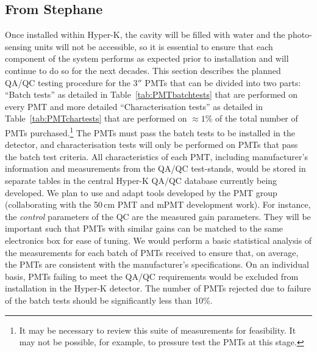 \documentclass[12pt,a4paper]{article}
\newcommand{\inches}{$''$\xspace}
\begin{document}
\subsection{From Stephane}
Once installed within Hyper-K, the cavity will be filled with water and the photo-sensing units will not be accessible, so it is essential to ensure that each component of the system performs as expected prior to installation and will continue to do so for the next decades. This section describes the planned QA/QC testing procedure for the 3\inches PMTs that can be divided into two parts: ``Batch tests'' as detailed in Table~\ref{tab:PMTbatchtests} that are performed on every PMT and more detailed ``Characterisation tests'' as detailed in Table~\ref{tab:PMTchartests} that are performed on $\approx 1$\% of the total number of PMTs purchased.\footnote{It may be necessary to review this suite of measurements for feasibility. It may not be possible, for example, to pressure test the PMTs at this stage.}
The PMTs must pass the batch tests to be installed in the detector, and characterisation tests will only be performed on PMTs that pass the batch test criteria. All characteristics of each PMT, including manufacturer's information and measurements from the QA/QC test-stands, would be stored in separate tables in the central Hyper-K QA/QC database currently being developed. We plan to use and adapt tools developed by the PMT group (collaborating with the 50\,cm PMT and mPMT development work). For instance, the {\it{control}} parameters of the QC are the measured gain parameters. They will be important such that PMTs with similar gains can be matched to the same electronics box for ease of tuning. We would perform a basic statistical analysis of the measurements for each batch of PMTs received to ensure that, on average, the PMTs are consistent with the manufacturer's specifications. On an individual basis, PMTs failing to meet the QA/QC requirements would be excluded from installation in the Hyper-K detector.  The number of PMTs rejected due to failure of the batch tests should be significantly less than 10\%.
\end{document}

